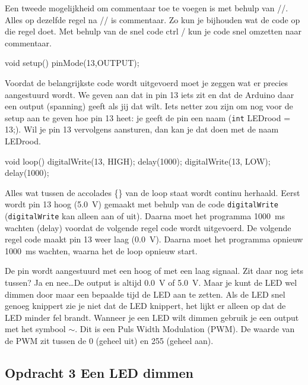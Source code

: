 \documentclass{arduino}
\begin{document}
Een tweede mogelijkheid om commentaar toe te voegen is met behulp van //. Alles op dezelfde regel na // is commentaar. Zo kun je bijhouden wat de code op die regel doet. Met behulp van de snel code ctrl / kun je code snel omzetten naar commentaar.
\begin{marginlisting}
void setup(){
  pinMode(13,OUTPUT);
}
\end{marginlisting}


Voordat de belangrijkste code wordt uitgevoerd moet je zeggen wat er precies aangestuurd wordt. We geven aan dat in pin 13 iets zit en dat de Arduino daar een output (spanning) geeft als jij dat wilt. Iets netter zou zijn om nog voor de setup aan te geven hoe pin 13 heet: je geeft de pin een naam (\lstinline{int} LEDrood = 13;). Wil je pin 13 vervolgens aansturen, dan kan je dat doen met de naam LEDrood.
\begin{marginlisting}
void loop() {
  digitalWrite(13, HIGH);
  delay(1000);
  digitalWrite(13, LOW);
  delay(1000);
}
\end{marginlisting}

Alles wat tussen de accolades \{\} van de loop staat wordt continu herhaald. Eerst wordt pin 13 hoog (\SI{5.0}{\volt}) gemaakt met behulp van de code \lstinline{digitalWrite} (\lstinline{digitalWrite} kan alleen aan of uit). Daarna moet het programma \SI{1000}{\milli\s} wachten (delay) voordat de volgende regel code wordt uitgevoerd. De volgende regel code maakt pin 13 weer laag (\SI{0.0}{\volt}). Daarna moet het programma opnieuw \SI{1000}{\milli\s} wachten, waarna het de loop opnieuw start.


De pin wordt aangestuurd met een hoog of met een laag signaal. Zit daar nog iets tussen? Ja en nee\dots De output is altijd \SI{0.0}{\volt} of \SI{5.0}{\volt}. Maar je kunt de LED wel dimmen door maar een bepaalde tijd de LED aan te zetten. Als de LED snel genoeg knippert zie je niet dat de LED knippert, het lijkt er alleen op dat de LED minder fel brandt. Wanneer je een LED wilt dimmen gebruik je een output met het symbool $\sim$. Dit is een Puls Width Modulation (PWM). De waarde van de PWM zit tussen de 0 (geheel uit) en 255 (geheel aan).

\newpage

\subsection{Opdracht 3 Een LED dimmen}
\end{document}
